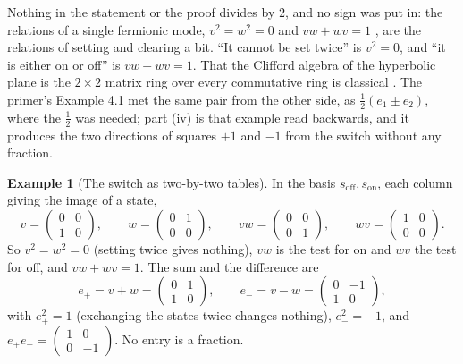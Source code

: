 \documentclass[11pt]{article}
\theoremstyle{definition}
\newtheorem{example}[theorem]{Example}
\theoremstyle{plain}
\begin{document}
Nothing in the statement or the proof divides by $2$, and no sign was put in: the relations of a single fermionic mode, $v^{2} = w^{2} = 0$ and $vw + wv = 1$ \cite{JordanWigner1928}, are the relations of setting and clearing a bit. ``It cannot be set twice'' is $v^{2} = 0$, and ``it is either on or off'' is $vw + wv = 1$. That the Clifford algebra of the hyperbolic plane is the $2 \times 2$ matrix ring over every commutative ring is classical \cite{Bass1974, Knus1991}. The primer's Example 4.1 \cite{ButlerT0} met the same pair from the other side, as $\tfrac12(e_{1} \pm e_{2})$, where the $\tfrac12$ was needed; part (iv) is that example read backwards, and it produces the two directions of squares $+1$ and $-1$ from the switch without any fraction.

\begin{example}[The switch as two-by-two tables]\label{c:note.geometry-first.switch-two-two-tables}
In the basis $s_{\mathrm{off}}, s_{\mathrm{on}}$, each column giving the image of a state,
\[
v = \begin{pmatrix} 0 & 0 \\ 1 & 0 \end{pmatrix}, \qquad
w = \begin{pmatrix} 0 & 1 \\ 0 & 0 \end{pmatrix}, \qquad
vw = \begin{pmatrix} 0 & 0 \\ 0 & 1 \end{pmatrix}, \qquad
wv = \begin{pmatrix} 1 & 0 \\ 0 & 0 \end{pmatrix} .
\]
So $v^{2} = w^{2} = 0$ (setting twice gives nothing), $vw$ is the test for on and $wv$ the test for off, and $vw + wv = 1$. The sum and the difference are
\[
e_{+} = v + w = \begin{pmatrix} 0 & 1 \\ 1 & 0 \end{pmatrix}, \qquad
e_{-} = v - w = \begin{pmatrix} 0 & -1 \\ 1 & 0 \end{pmatrix},
\]
with $e_{+}^{2} = 1$ (exchanging the states twice changes nothing), $e_{-}^{2} = -1$, and $e_{+}e_{-} = \begin{pmatrix} 1 & 0 \\ 0 & -1 \end{pmatrix}$. No entry is a fraction.
\end{example}
\end{document}
